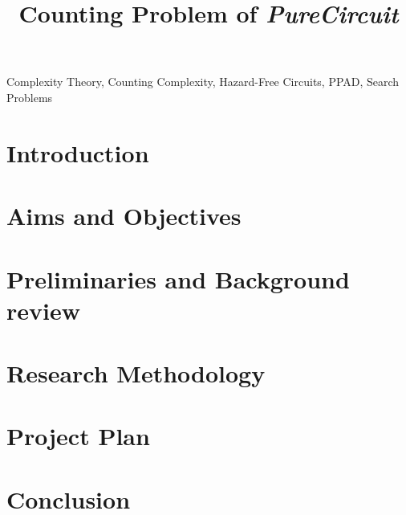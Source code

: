 \documentclass[onecolumn]{IEEEtran}
\begin{document}
\title{Counting Problem of \textit{PureCircuit}}

\author{
}

\maketitle

\begin{abstract}

\end{abstract}

\begin{IEEEkeywords} %
Complexity Theory, Counting Complexity, Hazard-Free Circuits, PPAD, Search Problems
\end{IEEEkeywords}

\section{Introduction}


\section{Aims and Objectives}

\section{Preliminaries and Background review}


\section{Research Methodology} 


\section{Project Plan} 


\section{Conclusion} 




\end{document}
